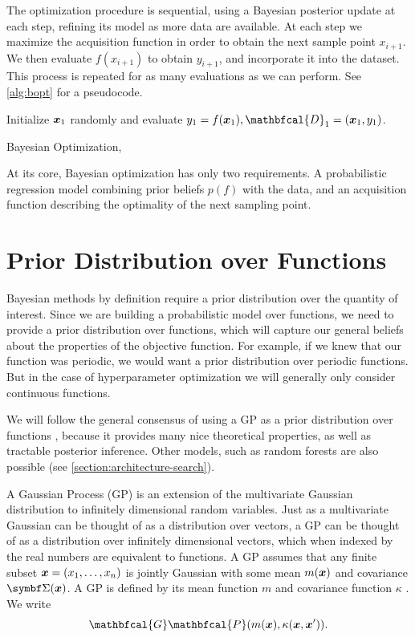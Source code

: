 The optimization procedure is sequential, using a Bayesian posterior update at
each step, refining its model as more data are available. At each step we
maximize the acquisition function in order to obtain the next sample point
$x_{i+1}$. We then evaluate $f(x_{i+1})$ to obtain $y_{i+1}$, and incorporate
it into the dataset. This process is repeated for as many evaluations as we
can perform. See \autoref{alg:bopt} for a pseudocode.

\begin{algorithm}
  \DontPrintSemicolon
  \SetAlgoLined
  Initialize ${\boldsymbol{x}}_1$ randomly and evaluate $y_1 = f(\vx_1), \mathbfcal{D}_1 = {(\vx_1, y_1)}$. \;
  \caption{Bayesian Optimization, \cite{nando-bopt-tutorial}}
  \label{alg:bopt}
\end{algorithm}


At its core, Bayesian optimization has only two requirements. A probabilistic
regression model combining prior beliefs $p(f)$ with the data, and an
acquisition function describing the optimality of the next sampling point.

\section{Prior Distribution over Functions}

Bayesian methods by definition require a prior distribution over the quantity
of interest. Since we are building a probabilistic model over functions, we
need to provide a prior distribution over functions, which will capture our
general beliefs about the properties of the objective function. For example, if
we knew that our function was periodic, we would want a prior distribution over
periodic functions. But in the case of hyperparameter optimization we will
generally only consider continuous functions.

We will follow the general consensus of using a GP as a prior distribution over
functions \citep{nando-bopt-tutorial}, because it provides many nice
theoretical properties, as well as tractable posterior inference. Other models,
such as random forests are also possible (see
\autoref{section:architecture-search}).

A Gaussian Process (GP) is an extension of
the multivariate Gaussian distribution to infinitely dimensional random
variables. Just as a multivariate Gaussian can be thought of as a distribution
over vectors, a GP can be thought of as a distribution over infinitely
dimensional vectors, which when indexed by the real numbers are equivalent to
functions. A GP assumes that any finite subset ${\boldsymbol{x}} = (x_1, \ldots, x_n)$ is
jointly Gaussian with some mean $m({\boldsymbol{x}})$ and covariance $\mSigma(\vx)$. A GP is
defined by its mean function $m$ and covariance function $\kappa$
\citep{murphy2012machine}. We write
$$
  \mathbfcal{G}\mathbfcal{P}(m(\vx), \kappa(\vx, \vx')).
$$


